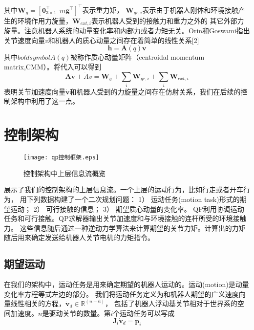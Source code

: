 其中${{\boldsymbol{W}}_{g}}={{[\mathbf{0}_{3\times 1}^{\top }\ \ m{{\mathbf{g}}^{\top }}]}^{\top }}$表示重力矩，
${\boldsymbol{W}}_{gr,i}$表示由于机器人刚体和环境接触产生的环境作用力旋量，${\boldsymbol{W}}_{ext,i}$表示机器人受到的接触力和重力之外的
其它外部力旋量。注意机器人系统的动量变化率和内部力或者力矩无关。Orin和Goswami指出关节速度向量$v$和机器人的质心动量之间存在着简单的线性关系[2]
\begin{equation}
    \label{equ:euler_linear_equ}
    \boldsymbol{h}=\boldsymbol{A}(q)\boldsymbol{v}
\end{equation}
其中$boldsymbol{A}(q)$被称作质心动量矩阵（centroidal momentum matrix,CMM）。将代入可以得到
\begin{equation}
    \label{equ:euler_wrench}
    \boldsymbol{A}\dot{\boldsymbol{v}}+\dot{A}v={{\boldsymbol{W}}_{g}}+\sum\limits_{i}{{{\boldsymbol{W}}_{gr,i}}}
    +\sum\limits_{i}{{{\boldsymbol{W}}_{ext,i}}}
\end{equation}
表明关节加速度向量$\dot{\boldsymbol{v}}$和机器人受到的力旋量之间存在仿射关系，我们在后续的控制架构中利用了这一点。

\section{控制架构}
\begin{figure}[htbp]
    \centering
    \texttt{[image: qp控制框架.eps]}
    \caption{\label{fig:framework_control_flow}控制架构中上层信息流概览}
\end{figure}
展示了我们的控制架构的上层信息流。一个上层的运动行为，比如行走或者开车行为，
用下列数据构建了一个二次规划问题：
1）	运动任务(motion task)形式的期望运动；
2）	可行接触的信息；
3）	期望质心动量的变化率。
QP利用协调运动任务和可行接触。QP求解器输出关节加速度和与环境接触的连杆所受的环境接触力。
这些信息随后通过一种逆动力学算法来计算期望的关节力矩。计算出的力矩随后用来确定发送给机器人关节电机的力矩指令。
\subsection{期望运动}
在我们的架构中，运动任务是用来确定期望的机器人运动的。运动(motion)是动量变化率方程等式左边的部分。
我们将运动任务定义为和机器人期望的广义速度向量线性相关的方程，${\dot{\boldsymbol{v}}}_{d}\in {\mathbb{R}}^{(n+6)}$，
包括了机器人浮动基关节相对于世界系的空间加速度。$n$是驱动关节的数量。第$i$个运动任务可以写成
\begin{equation}
    \label{equ:motion_task}
    \boldsymbol{J}_i \dot {\boldsymbol{v}}_d = \boldsymbol{p}_i
\end{equation}


